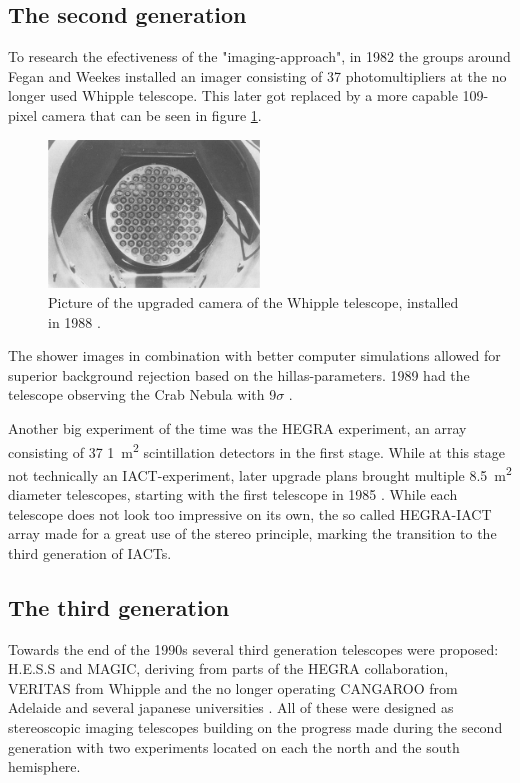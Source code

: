 \subsection{The second generation}
To research the efectiveness of the "imaging-approach", in 1982 the groups around Fegan and Weekes
installed an imager consisting of 37 photomultipliers at the no longer used Whipple telescope.
This later got replaced by a more capable 109-pixel camera that can be seen in figure \ref{fig:whipple_cam}.

\begin{figure}
	\centering
    \includegraphics[width=0.5\textwidth]{images/whipple_cam.png}
    \caption{Picture of the upgraded camera of the Whipple telescope, installed in 1988 \cite{Cawley1995}.}  %
    \label{fig:whipple_cam}
\end{figure}

The shower images in combination with better computer simulations allowed for 
superior background rejection based on the  hillas-parameters.
1989 had the telescope observing the Crab Nebula with 9$\sigma$ 
\cite{1989ApJ...342..379W}.


Another big experiment of the time was the HEGRA experiment, an array consisting 
of 37 \SI{1}{\meter^2} scintillation detectors \cite{ALLKOFER1990345} in the first stage.
While at this stage not technically an IACT-experiment, later upgrade plans
brought multiple \SI{8.5}{\meter^2} diameter telescopes, starting with the first 
telescope in 1985 \cite{DAUM19971}.
While each telescope does not look too impressive on its own,
the so called HEGRA-IACT array made for a great use of the stereo principle,
marking the transition to the third generation of IACTs.


\subsection{The third generation}

Towards the end of the 1990s several third generation telescopes were
proposed:
H.E.S.S and MAGIC, deriving from parts of the HEGRA collaboration, 
VERITAS from Whipple and the no longer operating CANGAROO from Adelaide and 
several japanese universities \cite{HILLAS201319}.
All of these were designed as stereoscopic imaging telescopes building on the progress made during the 
second generation with two experiments located on each the north and the south hemisphere.

